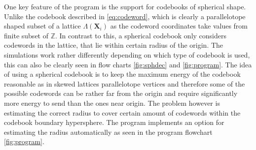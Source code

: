 \documentclass[english,12pt,a4paper,pdftex,sci,utf8]{aaltothesis}
\begin{document}
\par One key feature of the program is the support for codebooks of spherical shape. Unlike the codebook described in \eqref{eq:codeword}, which is clearly a parallelotope shaped subset of a lattice $\Lambda(\textbf{X}_i)$ as the codeword coordinates take values from finite subset of $\mathbb{Z}$. In contrast to this, a spherical codebook only considers codewords in the lattice, that lie within certain radius of the origin. The simulations work rather differently depending on which type of codebook is used, this can also be clearly seen in flow charts \ref{fig:sphdec} and \ref{fig:program}. The idea of using a spherical codebook is to keep the maximum energy of the codebook reasonable as in skewed lattices parallelotope vertices and therefore some of the possible codewords can be rather far from the origin and require significantly more energy to send than the ones near origin. The problem however is estimating the correct radius to cover certain amount of codewords within the codebook boundary hypersphere. The program implements an option for estimating the radius automatically as seen in the program flowchart \ref{fig:program}.
\end{document}
